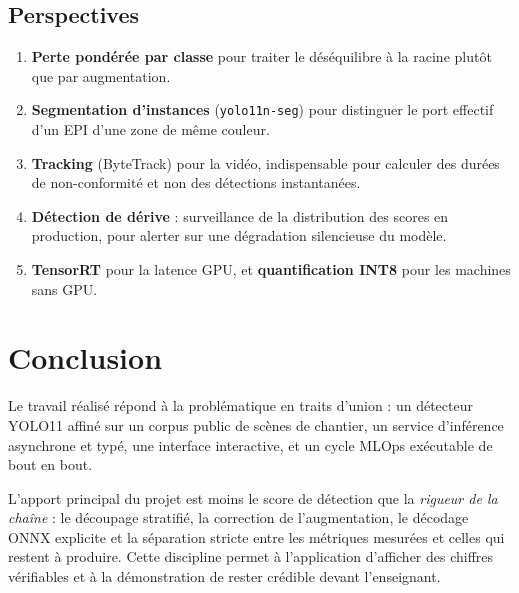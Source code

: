 \documentclass[11pt,a4paper]{article}
\begin{document}
\subsection{Perspectives}

\begin{enumerate}[leftmargin=1.4em]
  \item \textbf{Perte pondérée par classe} pour traiter le déséquilibre à la
        racine plutôt que par augmentation.
  \item \textbf{Segmentation d'instances} (\texttt{yolo11n-seg}) pour
        distinguer le port effectif d'un EPI d'une zone de même couleur.
  \item \textbf{Tracking} (ByteTrack) pour la vidéo, indispensable pour
        calculer des durées de non-conformité et non des détections
        instantanées.
  \item \textbf{Détection de dérive} : surveillance de la distribution des
        scores en production, pour alerter sur une dégradation silencieuse
        du modèle.
  \item \textbf{TensorRT} pour la latence GPU, et \textbf{quantification
        INT8} pour les machines sans GPU.
\end{enumerate}

\section{Conclusion}

Le travail réalisé répond à la problématique en traits d'union : un
détecteur YOLO11 affiné sur un corpus public de scènes de chantier, un
service d'inférence asynchrone et typé, une interface interactive, et un
cycle MLOps exécutable de bout en bout.

L'apport principal du projet est moins le score de détection que la
\emph{rigueur de la chaîne} : le découpage stratifié, la correction de
l'augmentation, le décodage ONNX explicite et la séparation stricte entre
les métriques mesurées et celles qui restent à produire. Cette discipline
permet à l'application d'afficher des chiffres vérifiables et à la
démonstration de rester crédible devant l'enseignant.
\end{document}
